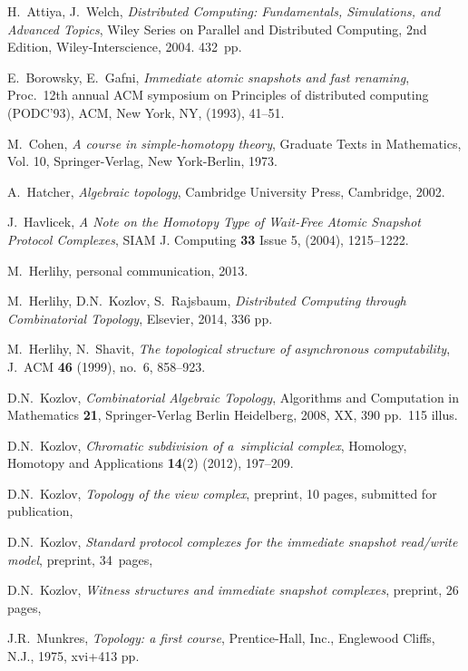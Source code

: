 \documentclass{amsart}[10pt]
\numberwithin{equation}{section}
\numberwithin{figure}{section}
\numberwithin{table}{section}
\begin{document}
\begin{thebibliography}{CR12a,}


 H.\ Attiya, J.\ Welch, {\it Distributed Computing:
  Fundamentals, Simulations, and Advanced Topics}, Wiley Series on
  Parallel and Distributed Computing, 2nd Edition, Wiley-Interscience,
  2004. 432~pp.

 E.\ Borowsky, E.\ Gafni, {\it Immediate atomic
  snapshots and fast renaming}, Proc.\ 12th annual ACM symposium on
  Principles of distributed computing (PODC'93), ACM, New York, NY,
  (1993), 41--51.

 M.\ Cohen, {\em A course in simple-homotopy
  theory}, Graduate Texts in Mathematics, Vol. 10, Springer-Verlag,
  New York-Berlin, 1973.
	
 A.\ Hatcher, {\it Algebraic topology}, Cambridge
University Press, Cambridge, 2002.

 J.\ Havlicek, {\em A Note on the Homotopy Type of Wait-Free 
Atomic Snapshot Protocol Complexes}, SIAM J. Computing {\bf 33} Issue 5, 
(2004), 1215--1222. 

 M.\ Herlihy, personal communication, 2013.

 M.\ Herlihy, D.N.\ Kozlov, S.\ Rajsbaum, {\it
  Distributed Computing through Combinatorial Topology}, Elsevier, 2014, 336 pp.

 M.\ Herlihy, N.\ Shavit, {\it The topological
  structure of asynchronous computability}, J.\ ACM {\bf 46} (1999),
  no.\ 6, 858--923.

 D.N.\ Kozlov, {\em Combinatorial
Algebraic Topology}, Algorithms and Computation in Mathematics {\bf
21}, Springer-Verlag Berlin Heidelberg, 2008, XX, 390 pp.\ 115 illus.

 D.N.\ Kozlov, {\em Chromatic subdivision of 
a~simplicial complex}, Homology, Homotopy and Applications {\bf
  14}(2) (2012), 197--209.

 D.N.\ Kozlov, {\em Topology of the view complex},
  preprint, 10 pages, submitted for publication, 

 D.N.\ Kozlov, {\em Standard protocol complexes
  for the immediate snapshot read/write model}, preprint,
  34~pages, 

 D.N.\ Kozlov, {\em Witness structures and
  immediate snapshot complexes}, preprint, 26 pages, 

 J.R.\ Munkres, {\em Topology: a first course},
  Prentice-Hall, Inc., Englewood Cliffs, N.J., 1975, xvi+413 pp.

\end{thebibliography}
\end{document}
